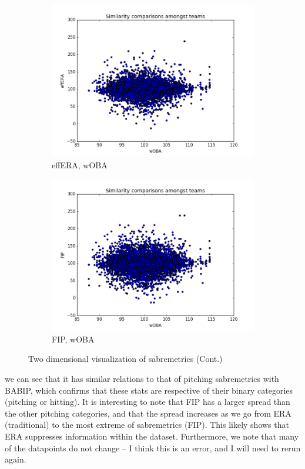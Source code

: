 \documentclass[12pt]{article}
\numberwithin{equation}{subsection}
\begin{document}
\begin{figure}[H]
\begin{subfigure}[b]{0.5\linewidth}
    \includegraphics[width=0.9\linewidth]{Sim13} 
    \caption{effERA, wOBA} 
    \label{fig5:c} 
  \end{subfigure}%
  \begin{subfigure}[b]{0.5\linewidth}
    \centering
    \includegraphics[width=0.9\linewidth]{Sim14} 
    \caption{FIP, wOBA} 
    \label{fig5:d} 
  \end{subfigure} 
  \caption{Two dimensional visualization of sabremetrics (Cont.)}
  \label{fig5} 
\end{figure}

we can see that it has similar relations to that of pitching sabremetrics with BABIP, which confirms that these stats are respective of their binary categories (pitching or hitting). It is interesting to note that FIP has a larger spread than the other pitching categories, and that the spread increases as we go from ERA (traditional) to the most extreme of sabremetrics (FIP). This likely shows that ERA suppresses information within the dataset. Furthermore, we note that many of the datapoints do not change -- I think this is an error, and I will need to rerun again.
\end{document}
